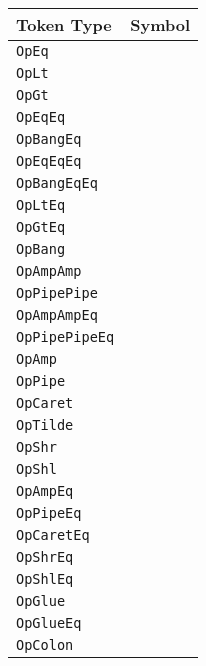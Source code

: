 \begin{table}[h]
\parbox[t]{0.45\linewidth}{
    \centering
    \begin{tabular}[t]{ll}
        \hline
        \textbf{Token Type} & \textbf{Symbol} \\
        \hline
        \texttt{OpEq} & \op{=} \\
        \texttt{OpLt} & \op{<} \\
        \texttt{OpGt} & \op{>} \\
        \texttt{OpEqEq} & \op{==} \\
        \texttt{OpBangEq} & \op{!=} \\
        \texttt{OpEqEqEq} & \op{===} \\
        \texttt{OpBangEqEq} & \op{!==} \\
        \texttt{OpLtEq} & \op{<=} \\
        \texttt{OpGtEq} & \op{>=} \\
        \hline
        \texttt{OpBang} & \op{!} \\
        \texttt{OpAmpAmp} & \op{\&\&} \\
        \texttt{OpPipePipe} & \op{||} \\
        \texttt{OpAmpAmpEq} & \op{\&\&=} \\
        \texttt{OpPipePipeEq} & \op{||=} \\
        \hline
        \texttt{OpAmp} & \op{\&} \\
        \texttt{OpPipe} & \op{|} \\
        \texttt{OpCaret} & \op{\textasciicircum} \\
        \texttt{OpTilde} & \op{\textasciitilde} \\
        \texttt{OpShr} & \op{\textasciitilde>} \\
        \texttt{OpShl} & \op{<\textasciitilde} \\
        \hline
        \texttt{OpAmpEq} & \op{\&=} \\
        \texttt{OpPipeEq} & \op{|=} \\
        \texttt{OpCaretEq} & \op{\textasciicircum=} \\
        \texttt{OpShrEq} & \op{\textasciitilde>=} \\
        \texttt{OpShlEq} & \op{<\textasciitilde=} \\
        \hline
        \texttt{OpGlue} & \op{<>} \\
        \texttt{OpGlueEq} & \op{<>=} \\
        \texttt{OpColon} & \op{:} \\

\end{tabular}}
\end{table}
